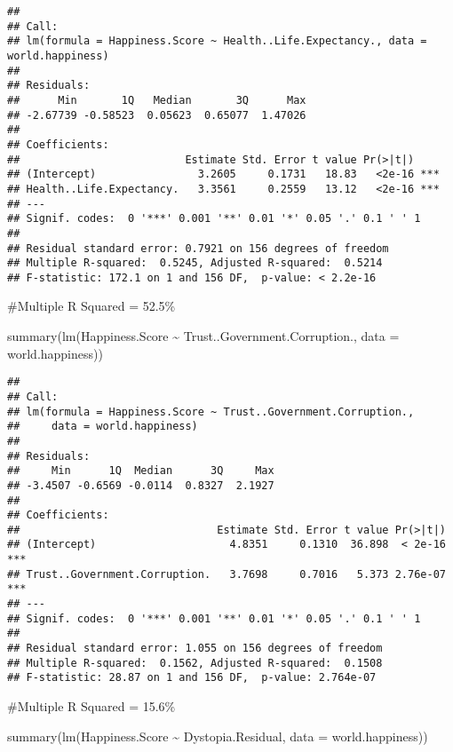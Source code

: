 \documentclass[
]{article}
\newenvironment{Shaded}{\begin{snugshade}}{\end{snugshade}}
\newcommand{\AttributeTok}[1]{\textcolor[rgb]{0.77,0.63,0.00}{#1}}
\newcommand{\FunctionTok}[1]{\textcolor[rgb]{0.00,0.00,0.00}{#1}}
\newcommand{\NormalTok}[1]{#1}
\newcommand{\SpecialCharTok}[1]{\textcolor[rgb]{0.00,0.00,0.00}{#1}}
\begin{document}
\begin{verbatim}
## 
## Call:
## lm(formula = Happiness.Score ~ Health..Life.Expectancy., data = world.happiness)
## 
## Residuals:
##      Min       1Q   Median       3Q      Max 
## -2.67739 -0.58523  0.05623  0.65077  1.47026 
## 
## Coefficients:
##                          Estimate Std. Error t value Pr(>|t|)    
## (Intercept)                3.2605     0.1731   18.83   <2e-16 ***
## Health..Life.Expectancy.   3.3561     0.2559   13.12   <2e-16 ***
## ---
## Signif. codes:  0 '***' 0.001 '**' 0.01 '*' 0.05 '.' 0.1 ' ' 1
## 
## Residual standard error: 0.7921 on 156 degrees of freedom
## Multiple R-squared:  0.5245, Adjusted R-squared:  0.5214 
## F-statistic: 172.1 on 1 and 156 DF,  p-value: < 2.2e-16
\end{verbatim}

\#Multiple R Squared = 52.5\%

\begin{Shaded}
\begin{Highlighting}[]
\FunctionTok{summary}\NormalTok{(}\FunctionTok{lm}\NormalTok{(Happiness.Score }\SpecialCharTok{\textasciitilde{}}\NormalTok{ Trust..Government.Corruption., }\AttributeTok{data =}\NormalTok{ world.happiness))}
\end{Highlighting}
\end{Shaded}

\begin{verbatim}
## 
## Call:
## lm(formula = Happiness.Score ~ Trust..Government.Corruption., 
##     data = world.happiness)
## 
## Residuals:
##     Min      1Q  Median      3Q     Max 
## -3.4507 -0.6569 -0.0114  0.8327  2.1927 
## 
## Coefficients:
##                               Estimate Std. Error t value Pr(>|t|)    
## (Intercept)                     4.8351     0.1310  36.898  < 2e-16 ***
## Trust..Government.Corruption.   3.7698     0.7016   5.373 2.76e-07 ***
## ---
## Signif. codes:  0 '***' 0.001 '**' 0.01 '*' 0.05 '.' 0.1 ' ' 1
## 
## Residual standard error: 1.055 on 156 degrees of freedom
## Multiple R-squared:  0.1562, Adjusted R-squared:  0.1508 
## F-statistic: 28.87 on 1 and 156 DF,  p-value: 2.764e-07
\end{verbatim}

\#Multiple R Squared = 15.6\%

\begin{Shaded}
\begin{Highlighting}[]
\FunctionTok{summary}\NormalTok{(}\FunctionTok{lm}\NormalTok{(Happiness.Score }\SpecialCharTok{\textasciitilde{}}\NormalTok{ Dystopia.Residual, }\AttributeTok{data =}\NormalTok{ world.happiness))}
\end{Highlighting}
\end{Shaded}
\end{document}
